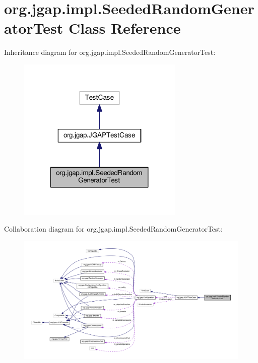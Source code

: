 \hypertarget{classorg_1_1jgap_1_1impl_1_1_seeded_random_generator_test}{\section{org.\-jgap.\-impl.\-Seeded\-Random\-Generator\-Test Class Reference}
\label{classorg_1_1jgap_1_1impl_1_1_seeded_random_generator_test}
}


Inheritance diagram for org.\-jgap.\-impl.\-Seeded\-Random\-Generator\-Test\-:
\nopagebreak
\begin{figure}[H]
\begin{center}
\leavevmode
\includegraphics[width=224pt]{classorg_1_1jgap_1_1impl_1_1_seeded_random_generator_test__inherit__graph}
\end{center}
\end{figure}


Collaboration diagram for org.\-jgap.\-impl.\-Seeded\-Random\-Generator\-Test\-:
\nopagebreak
\begin{figure}[H]
\begin{center}
\leavevmode
\includegraphics[width=350pt]{classorg_1_1jgap_1_1impl_1_1_seeded_random_generator_test__coll__graph}
\end{center}
\end{figure}
